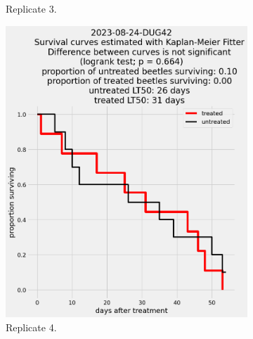 \documentclass[12pt,letterpaper,english,bibliography=totocnumbered, abstract=on]{scrartcl}
\begin{document}
\begin{figure}[h]
\begin{subfigure}{.3\textwidth}
		\caption{Replicate 3.}
	\end{subfigure}
	\begin{subfigure}{.3\textwidth}
		\includegraphics[width=\textwidth]{images/survival_curves/2023-08-24-DUG42}
		\caption{Replicate 4.}
	\end{subfigure}
	\begin{subfigure}{.3\textwidth}

\end{subfigure}
\end{figure}
\end{document}

